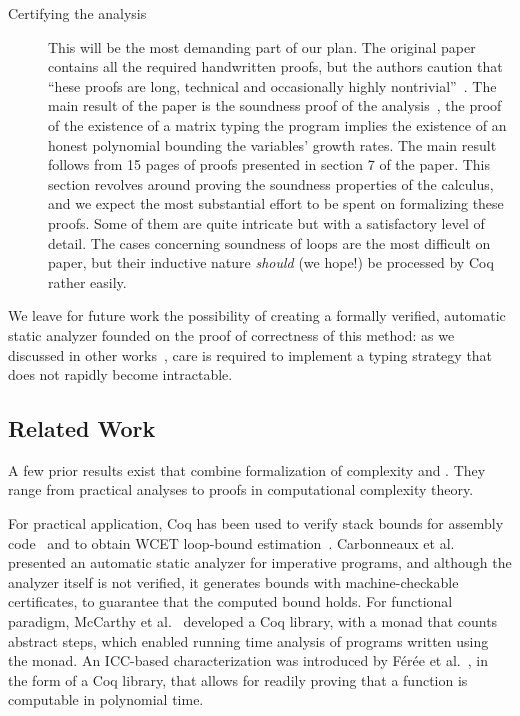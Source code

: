 \begin{description}
    \item[Certifying the analysis]
    This will be the most demanding part of our plan.
    The original paper contains all the required handwritten proofs, but the authors caution that
    \enquote{hese proofs are long, technical and occasionally highly nontrivial}~\cite[p.~2]{jones2009}.
    The main result of the paper is the soundness proof of the analysis~\cite[Theorem 5.3]{jones2009},
    \ie the proof of the existence of a matrix typing the program implies the existence of an honest polynomial bounding the variables' growth rates.
    The main result follows from 15 pages of proofs presented in section 7 of the paper.
    This section revolves around proving the soundness properties of the calculus, and we expect the most substantial effort to be spent on formalizing these proofs.
    Some of them are quite intricate but with a satisfactory level of detail.
    The cases concerning soundness of loops are the most difficult on paper, but their inductive nature \emph{should} (we hope!) be processed by Coq rather easily.
\end{description}

We leave for future work the possibility of creating a formally verified, automatic static analyzer founded on the proof of correctness of this method: as we discussed in other works~\cite{aubert2023b,aubert20222}, care is required to implement a typing strategy that does not rapidly become intractable.

\subsection{Related Work}
\label{subsec:coqpl-related}

A few prior results exist that combine formalization of complexity and .
They range from practical analyses to proofs in computational complexity theory.

For practical application, Coq has been used to verify stack bounds for assembly code~\cite{carbonneaux2014} and to obtain WCET loop-bound estimation~\cite{blazy2013}.
    {Carbonneaux et al.}~\cite{carbonneaux2017} presented an automatic static analyzer for imperative programs, and although the analyzer itself is not verified, it generates bounds with machine-checkable certificates, to guarantee that the computed bound holds.
For functional paradigm, McCarthy et al.~\cite{mccarthy2018} developed a Coq library, with a monad that counts abstract steps, which enabled running time analysis of programs written using the monad.
An ICC-based characterization was introduced by Férée et al.~\cite{feree2018}, in the form of a Coq library, that allows for readily proving that a function is computable in polynomial time.

